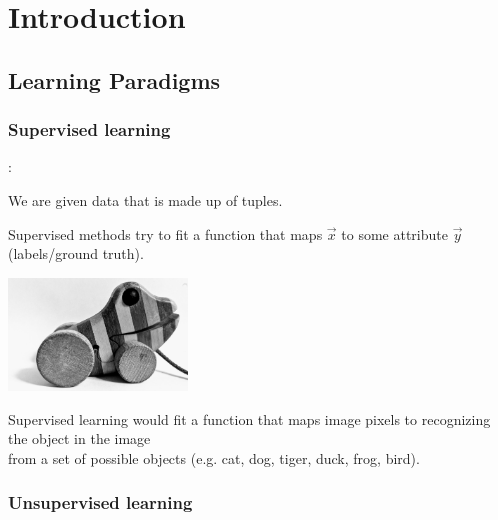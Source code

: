 \section{Introduction}



\subsection{Learning Paradigms}

\subsubsection{Supervised learning}

\begin{frame}{\subsecname:~\subsubsecname}

We are given data that is made up of tuples.

Supervised methods try to fit a function that maps $\vec x$ to some attribute $\vec y$ (labels/ground truth).

\begin{center}
	\includegraphics[height=3cm]{img/tigerente}
\end{center}

Supervised learning would fit a function that maps image pixels to recognizing the object in the image\\
from a set of possible objects (e.g. cat, dog, tiger, duck, frog, bird).
    
\end{frame}

\subsubsection{Unsupervised learning}

